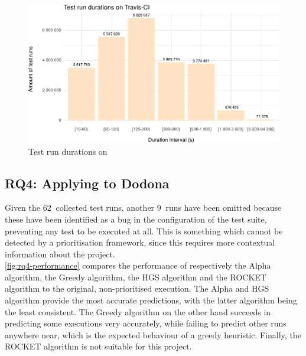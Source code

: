 \begin{figure}[htbp!]
	\centering
	\includegraphics[width=\textwidth]{assets/charts/rq3-test-run-durations.pdf}
	\caption{Test run durations on \travisci{}}
	\label{fig:rq3-durations}
\end{figure}


\subsection{RQ4: Applying \tcp{} to Dodona}
Given the $\SI{62}{}$ collected test runs, another $\SI{9}{}$ runs have been omitted because these have been identified as a bug in the configuration of the test suite, preventing any test to be executed at all. This is something which cannot be detected by a prioritisation framework, since this requires more contextual information about the project.\\

\noindent \autoref{fig:rq4-performance} compares the performance of respectively the Alpha algorithm, the Greedy algorithm, the HGS algorithm and the ROCKET algorithm to the original, non-prioritised execution. The Alpha and HGS algorithm provide the most accurate predictions, with the latter algorithm being the least consistent. The Greedy algorithm on the other hand succeeds in predicting some executions very accurately, while failing to predict other runs anywhere near, which is the expected behaviour of a greedy heuristic. Finally, the ROCKET algorithm is not suitable for this project.\\

